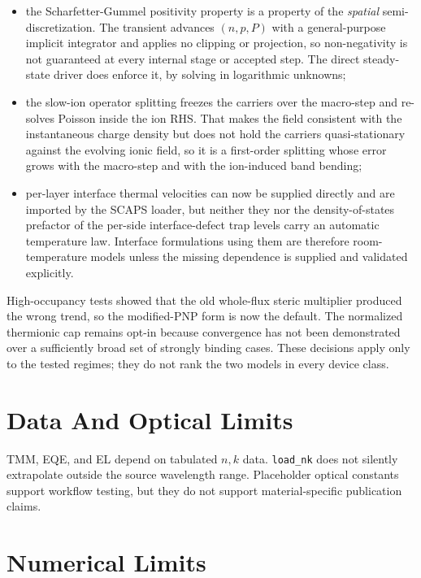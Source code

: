 \documentclass[
  11pt,
  american,
]{report}
\begin{document}
\begin{itemize}
  the photon-recycling redistribution is spatially uniform, with no
  spatial or spectral reabsorption kernel;
\item
  the Scharfetter-Gummel positivity property is a property of the
  \emph{spatial} semi-discretization. The transient advances \((n,p,P)\)
  with a general-purpose implicit integrator and applies no clipping or
  projection, so non-negativity is not guaranteed at every internal
  stage or accepted step. The direct steady-state driver does enforce
  it, by solving in logarithmic unknowns;
\item
  the slow-ion operator splitting freezes the carriers over the
  macro-step and re-solves Poisson inside the ion RHS. That makes the
  field consistent with the instantaneous charge density but does not
  hold the carriers quasi-stationary against the evolving ionic field,
  so it is a first-order splitting whose error grows with the macro-step
  and with the ion-induced band bending;
\item
  per-layer interface thermal velocities can now be supplied directly
  and are imported by the SCAPS loader, but neither they nor the
  density-of-states prefactor of the per-side interface-defect trap
  levels carry an automatic temperature law. Interface formulations
  using them are therefore room-temperature models unless the missing
  dependence is supplied and validated explicitly.
\end{itemize}

High-occupancy tests showed that the old whole-flux steric multiplier
produced the wrong trend, so the modified-PNP form is now the default.
The normalized thermionic cap remains opt-in because convergence has not
been demonstrated over a sufficiently broad set of strongly binding
cases. These decisions apply only to the tested regimes; they do not
rank the two models in every device class.

\hypertarget{data-and-optical-limits}{%
\section{Data And Optical Limits}\label{data-and-optical-limits}}

TMM, EQE, and EL depend on tabulated \(n,k\) data. \texttt{load\_nk}
does not silently extrapolate outside the source wavelength range.
Placeholder optical constants support workflow testing, but they do not
support material-specific publication claims.

\hypertarget{numerical-limits}{%
\section{Numerical Limits}\label{numerical-limits}}
\end{document}
